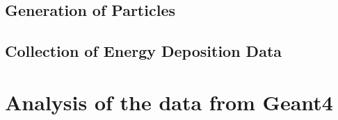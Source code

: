 \documentclass{article}
\begin{document}
\begin{multicols}{2}
\subsection{Generation of Particles}


\subsection{Collection of Energy Deposition Data}

\section{Analysis of the data from Geant4}




\end{multicols}


\end{document}
